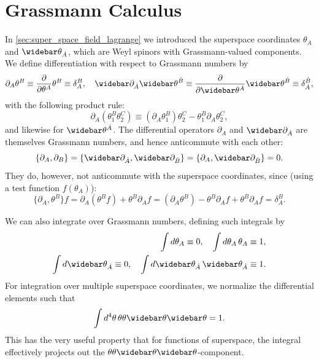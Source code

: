 \section{Grassmann Calculus}
In \cref{sec:super_space_field_lagrange} we introduced the superspace coordinates $\theta_A$ and $\thetabar_{\dot{A}}$, which are Weyl spinors with Grassmann-valued components.
We define differentiation with respect to Grassmann numbers by
\begin{equation}\label{eq:grassmann_diff}
    \partial_A \theta^B \equiv \frac{\partial}{\partial\theta^A} \theta^B \equiv \delta_A^B, \quad \widebar\partial_{\dot{A}} \thetabar^{\dot{B}} \equiv \frac{\partial}{\partial\thetabar^{\dot{A}}} \thetabar^{\dot{B}} \equiv \delta_{\dot{A}}^{\dot{B}},
\end{equation}
with the following product rule:
\begin{equation}
    \partial_A(\theta_1^B\theta_2^C) \equiv (\partial_A\theta_1^B)\theta_2^C - \theta_1^B \partial_A\theta_2^C,
\end{equation}
and likewise for $\thetabar^{\dot{A}}$.
The differential operators $\partial_A$ and $\widebar\partial_{\dot{A}}$ are themselves Grassmann numbers, and hence anticommute with each other:
\begin{equation}
    \{\partial_A, \partial_B\} = \{\widebar\partial_{\dot{A}}, \widebar\partial_{\dot{B}}\} = \{\partial_A, \widebar\partial_{\dot{B}}\} = 0.
\end{equation}
They do, however, not anticommute with the superspace coordinates, since (using a test function $f(\theta_A)$):
\begin{equation}
    \{\partial_A, \theta^B\}f = \partial_A(\theta^B f) + \theta^B\partial_A f = (\partial_A\theta^B) - \theta^B\partial_A f + \theta^B\partial_A f = \delta_A^B.
\end{equation}

We can also integrate over Grassmann numbers, defining such integrals by
\begin{align}
    \int d\theta_A \equiv 0, \quad \int d\theta_A \, \theta_A \equiv 1,
    \\
    \int d\thetabar_{\dot{A}} \equiv 0, \quad \int d\thetabar_{\dot{A}} \, \thetabar_{\dot{A}} \equiv 1.
\end{align}
For integration over multiple superspace coordinates, we normalize the differential elements such that
\begin{equation}
    \int d^4\theta \, \thetafour = 1.
\end{equation}
This has the very useful property that for functions of superspace, the integral effectively projects out the $\thetafour$-component.



